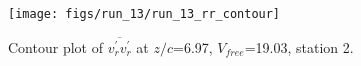 \begin{figure}[H]
\centering
\texttt{[image: figs/run\_13/run\_13\_rr\_contour]}
\caption{Contour plot of $\overline{v_{r}^{\prime} v_{r}^{\prime}}$ at $z/c$=6.97, $V_{free}$=19.03, station 2.}
\label{fig:run_13_rr_contour}
\end{figure}


